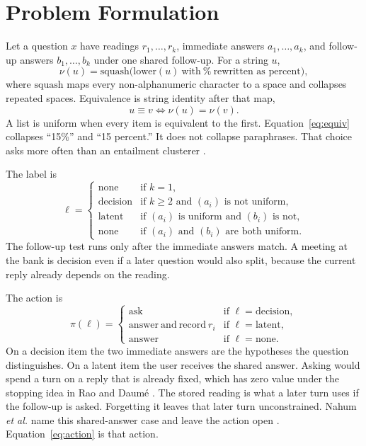 \documentclass[journal]{IEEEtran}
\begin{document}
\section{Problem Formulation}
\label{sec:problem}

Let a question $x$ have readings $r_1,\ldots,r_k$, immediate answers $a_1,\ldots,a_k$, and follow-up answers $b_1,\ldots,b_k$ under one shared follow-up.
For a string $u$,
\begin{equation}
\nu(u) = \mathrm{squash}\big(\mathrm{lower}(u)\ \text{with}\ \texttt{\%}\ \text{rewritten as percent}\big),
\label{eq:nu}
\end{equation}
where $\mathrm{squash}$ maps every non-alphanumeric character to a space and collapses repeated spaces.
Equivalence is string identity after that map,
\begin{equation}
u \equiv v \iff \nu(u) = \nu(v).
\label{eq:equiv}
\end{equation}
A list is uniform when every item is equivalent to the first.
Equation~\eqref{eq:equiv} collapses ``15\%'' and ``15 percent.''
It does not collapse paraphrases.
That choice asks more often than an entailment clusterer \cite{kuhn-etal-2023-semantic}.

The label is
\begin{equation}
\ell =
\begin{cases}
\mathrm{none} & \text{if } k = 1, \\
\mathrm{decision} & \text{if } k \ge 2 \text{ and } (a_i) \text{ is not uniform}, \\
\mathrm{latent} & \text{if } (a_i) \text{ is uniform and } (b_i) \text{ is not}, \\
\mathrm{none} & \text{if } (a_i) \text{ and } (b_i) \text{ are both uniform}.
\end{cases}
\label{eq:label}
\end{equation}
The follow-up test runs only after the immediate answers match.
A meeting at the bank is decision even if a later question would also split, because the current reply already depends on the reading.

The action is
\begin{equation}
\pi(\ell) =
\begin{cases}
\mathrm{ask} & \text{if } \ell = \mathrm{decision}, \\
\mathrm{answer\ and\ record\ } r_i & \text{if } \ell = \mathrm{latent}, \\
\mathrm{answer} & \text{if } \ell = \mathrm{none}.
\end{cases}
\label{eq:action}
\end{equation}
On a decision item the two immediate answers are the hypotheses the question distinguishes.
On a latent item the user receives the shared answer.
Asking would spend a turn on a reply that is already fixed, which has zero value under the stopping idea in Rao and Daum\'e \cite{rao-daume-iii-2018-learning}.
The stored reading is what a later turn uses if the follow-up is asked.
Forgetting it leaves that later turn unconstrained.
Nahum \emph{et al.} name this shared-answer case and leave the action open \cite{nahum-etal-2026-answers}.
Equation~\eqref{eq:action} is that action.
\end{document}
